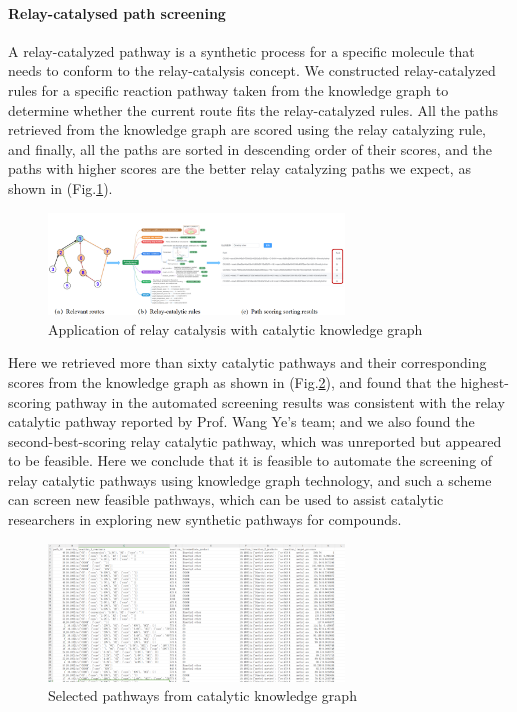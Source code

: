\documentclass[%
 aip,
 jmp,%
 amsmath,amssymb,
 reprint,%
]{revtex4-2}
\begin{document}
\paragraph{Relay-catalysed path screening}A relay-catalyzed pathway is a synthetic process for a specific molecule that needs to conform to the relay-catalysis concept. We constructed relay-catalyzed rules for a specific reaction pathway taken from the knowledge graph to determine whether the current route fits the relay-catalyzed rules. All the paths retrieved from the knowledge graph are scored using the relay catalyzing rule, and finally, all the paths are sorted in descending order of their scores, and the paths with higher scores are the better relay catalyzing paths we expect, as shown in (Fig.\ref{ Fig.21 }).

\begin{figure}[htbp]
 \centering
 \includegraphics[width=0.7\textwidth]{figure/21.png}
 \caption{ Application of relay catalysis with catalytic knowledge graph }
 \label{ Fig.21 }
\end{figure}

Here we retrieved more than sixty catalytic pathways and their corresponding scores from the knowledge graph as shown in (Fig.\ref{ Fig.22 }), and found that the highest-scoring pathway in the automated screening results was consistent with the relay catalytic pathway reported by Prof. Wang Ye's team; and we also found the second-best-scoring relay catalytic pathway, which was unreported but appeared to be feasible. Here we conclude that it is feasible to automate the screening of relay catalytic pathways using knowledge graph technology, and such a scheme can screen new feasible pathways, which can be used to assist catalytic researchers in exploring new synthetic pathways for compounds.

\begin{figure}[htbp]
    \centering
    \includegraphics[width=0.7\textwidth]{figure/22.png}
    \caption{ Selected pathways from catalytic knowledge graph }
    \label{ Fig.22 }
   \end{figure}
\end{document}
